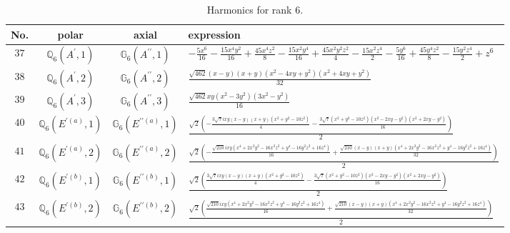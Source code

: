 \documentclass[fleqn,8pt,landscape]{jsarticle}
\begin{document}
\begin{table}[ht!]
\begin{center}
\caption{Harmonics for rank 6.}
\renewcommand{\arraystretch}{1.3}
\begin{tabular}{cccl} \hline \hline
No. & polar & axial & expression \\ \hline
$ 37 $ & $ \mathbb{Q}_{6}(A^{\prime},1) $ & $ \mathbb{G}_{6}(A^{\prime\prime},1) $ & $ - \frac{5 x^{6}}{16} - \frac{15 x^{4} y^{2}}{16} + \frac{45 x^{4} z^{2}}{8} - \frac{15 x^{2} y^{4}}{16} + \frac{45 x^{2} y^{2} z^{2}}{4} - \frac{15 x^{2} z^{4}}{2} - \frac{5 y^{6}}{16} + \frac{45 y^{4} z^{2}}{8} - \frac{15 y^{2} z^{4}}{2} + z^{6} $ \\
$ 38 $ & $ \mathbb{Q}_{6}(A^{\prime},2) $ & $ \mathbb{G}_{6}(A^{\prime\prime},2) $ & $ \frac{\sqrt{462} \left(x - y\right) \left(x + y\right) \left(x^{2} - 4 x y + y^{2}\right) \left(x^{2} + 4 x y + y^{2}\right)}{32} $ \\
$ 39 $ & $ \mathbb{Q}_{6}(A^{\prime},3) $ & $ \mathbb{G}_{6}(A^{\prime\prime},3) $ & $ \frac{\sqrt{462} x y \left(x^{2} - 3 y^{2}\right) \left(3 x^{2} - y^{2}\right)}{16} $ \\
$ 40 $ & $ \mathbb{Q}_{6}(E^{\prime(a)},1) $ & $ \mathbb{G}_{6}(E^{\prime\prime(a)},1) $ & $ \frac{\sqrt{2} \left(- \frac{3 \sqrt{7} i x y \left(x - y\right) \left(x + y\right) \left(x^{2} + y^{2} - 10 z^{2}\right)}{4} - \frac{3 \sqrt{7} \left(x^{2} + y^{2} - 10 z^{2}\right) \left(x^{2} - 2 x y - y^{2}\right) \left(x^{2} + 2 x y - y^{2}\right)}{16}\right)}{2} $ \\
$ 41 $ & $ \mathbb{Q}_{6}(E^{\prime(a)},2) $ & $ \mathbb{G}_{6}(E^{\prime\prime(a)},2) $ & $ \frac{\sqrt{2} \left(- \frac{\sqrt{210} i x y \left(x^{4} + 2 x^{2} y^{2} - 16 x^{2} z^{2} + y^{4} - 16 y^{2} z^{2} + 16 z^{4}\right)}{16} + \frac{\sqrt{210} \left(x - y\right) \left(x + y\right) \left(x^{4} + 2 x^{2} y^{2} - 16 x^{2} z^{2} + y^{4} - 16 y^{2} z^{2} + 16 z^{4}\right)}{32}\right)}{2} $ \\
$ 42 $ & $ \mathbb{Q}_{6}(E^{\prime(b)},1) $ & $ \mathbb{G}_{6}(E^{\prime\prime(b)},1) $ & $ \frac{\sqrt{2} \left(\frac{3 \sqrt{7} i x y \left(x - y\right) \left(x + y\right) \left(x^{2} + y^{2} - 10 z^{2}\right)}{4} - \frac{3 \sqrt{7} \left(x^{2} + y^{2} - 10 z^{2}\right) \left(x^{2} - 2 x y - y^{2}\right) \left(x^{2} + 2 x y - y^{2}\right)}{16}\right)}{2} $ \\
$ 43 $ & $ \mathbb{Q}_{6}(E^{\prime(b)},2) $ & $ \mathbb{G}_{6}(E^{\prime\prime(b)},2) $ & $ \frac{\sqrt{2} \left(\frac{\sqrt{210} i x y \left(x^{4} + 2 x^{2} y^{2} - 16 x^{2} z^{2} + y^{4} - 16 y^{2} z^{2} + 16 z^{4}\right)}{16} + \frac{\sqrt{210} \left(x - y\right) \left(x + y\right) \left(x^{4} + 2 x^{2} y^{2} - 16 x^{2} z^{2} + y^{4} - 16 y^{2} z^{2} + 16 z^{4}\right)}{32}\right)}{2} $ \\

\end{tabular}
\end{center}
\end{table}
\end{document}
